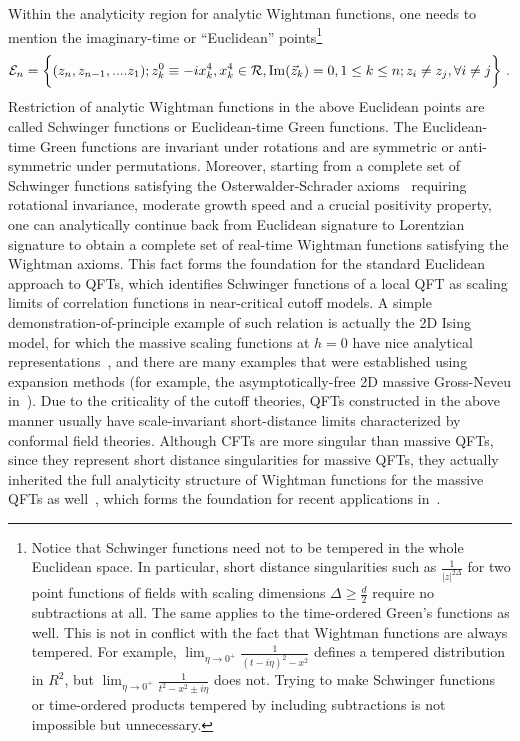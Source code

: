\documentclass[a4paper,11pt]{article}
\begin{document}
Within the analyticity region for analytic Wightman functions, one needs to mention the imaginary-time or ``Euclidean'' points\footnote{Notice that Schwinger functions need not to be tempered in the whole Euclidean space. In particular, short distance singularities such as $\frac{1}{|z|^{2\Delta}}$ for two point functions of fields with scaling dimensions $\Delta \ge \frac{d}{2}$ require no subtractions at all. The same applies to the time-ordered Green's functions as well. This is not in conflict with the fact that Wightman functions are always tempered. For example, $\lim_{\eta \rightarrow 0^+}\frac{1}{(t-i\eta)^2-x^2}$ defines a tempered distribution in $R^2$, but $\lim_{\eta \rightarrow 0^+}\frac{1}{t^2-x^2 \pm i\eta }$ does not. Trying to make Schwinger functions or time-ordered products tempered by including subtractions is not impossible but unnecessary. } 
\begin{align}
{\cal E}_n=\bigg\{(z_n,z_{n-1},....z_1); z_k^0\equiv -ix^4_k, x^4_k\in {\cal R}, {\rm Im}(\vec{z}_k)=0, 1\le k\le n; z_i\ne z_j, \forall i\ne j \bigg\} \ .
\end{align}
Restriction of analytic Wightman functions in the above Euclidean points are called Schwinger functions or Euclidean-time Green functions. The Euclidean-time Green functions are invariant under rotations and are symmetric or anti-symmetric under permutations. Moreover, starting from a complete set of Schwinger functions satisfying the Osterwalder-Schrader axioms~\cite{Osterwalder:1973dx,Osterwalder:1974tc} requiring rotational invariance, moderate growth speed and a crucial positivity property, one can analytically continue back from Euclidean signature to Lorentzian signature to obtain a complete set of real-time Wightman functions satisfying the Wightman axioms. This fact forms the foundation for the standard Euclidean approach to QFTs, which identifies Schwinger functions of a local QFT as scaling limits of correlation functions in near-critical cutoff models. A simple demonstration-of-principle example of such relation is actually the 2D Ising model, for which the massive scaling functions at $h=0$ have nice analytical representations~\cite{Wu:1975mw,McCoy:1977er}, and there are many examples that were established using expansion methods (for example, the asymptotically-free 2D massive Gross-Neveu in~\cite{Feldman:1985ar,Feldman:1986ax}). Due to the criticality of the cutoff theories, QFTs constructed in the above manner usually have scale-invariant short-distance limits characterized by conformal field theories. Although CFTs are more singular than massive QFTs, since they represent short distance singularities for massive QFTs, they actually inherited the full analyticity structure of Wightman functions for the massive QFTs as well~\cite{Luscher:1974ez,Hartman:2015lfa}, which forms the foundation for recent applications in~\cite{Caron-Huot:2017vep,Caron-Huot:2020nem}.
\end{document}
